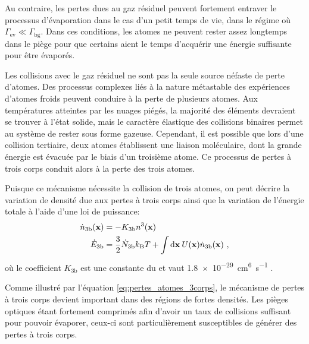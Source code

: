 Au contraire, les pertes dues au gaz résiduel peuvent fortement entraver le processus d'évaporation dans le cas d'un petit temps de vie, dans le régime où $\Gamma_{\mathrm{ev}} \ll \Gamma_{\mathrm{bg}}$. Dans ces conditions, les atomes ne peuvent rester assez longtemps dans le piège pour que certains aient le temps d'acquérir une énergie suffisante pour être évaporés.



Les collisions avec le gaz résiduel ne sont pas la seule source néfaste de perte d'atomes. Des processus complexes liés à la nature métastable des expériences d'atomes froids peuvent conduire à la perte de plusieurs atomes. Aux températures atteintes par les nuages piégés, la majorité des éléments devraient se trouver à l'état solide, mais le caractère élastique des collisions binaires permet au système de rester sous forme gazeuse. Cependant, il est possible que lors d'une collision tertiaire, deux atomes établissent une liaison moléculaire, dont la grande énergie est évacuée par le biais d'un troisième atome. Ce processus de pertes à trois corps conduit alors à la perte des trois atomes. 

Puisque ce mécanisme nécessite la collision de trois atomes, on peut décrire la variation de densité due aux pertes à trois corps ainsi que la variation de l'énergie totale à l'aide d'une loi de puissance:
\begin{align}
\dot{n}_{\mathrm{3b}}(\mathbf{x})&=-K_{\mathrm{3b}} n^3(\mathbf{x}) \label{eq:pertes_atomes_3corps} \\
\dot{E}_{\mathrm{3b}}&= \frac{3}{2}\dot{N}_{\mathrm{3b}} k_{\mathrm{B}} T + \int{\mathrm{d}\mathbf{x} \: U(\mathbf{x}) \dot{n}_{\mathrm{3b}}(\mathbf{x})}\text{ ,}
\end{align}
où le coefficient $K_{\mathrm{3b}}$ est une constante du  et vaut \SI{1.8e-29}{\centi\metre^6\second^{-1}} \citep{burt1997coherence,soding1999three}.


Comme illustré par l'équation \ref{eq:pertes_atomes_3corps}, le mécanisme de pertes à trois corps devient important dans des régions de fortes densités. Les pièges optiques étant fortement comprimés afin d'avoir un taux de collisions suffisant pour pouvoir évaporer, ceux-ci sont particulièrement susceptibles de générer des pertes à trois corps. 

